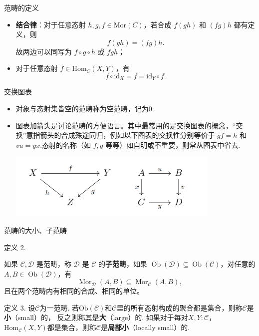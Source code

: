 \documentclass{beamer}
\newcommand\cat{\mathcal{C}}
\newcommand\obj[1]{\mathrm{Ob}(#1)}
\newcommand\Homc[3]{\mathrm{Hom}_{#1}(#2, #3)}
\begin{document}
	\begin{frame}{范畴的定义}
				\begin{itemize}[<+->]
				\item \textbf{结合律}：对于任意态射 $h, g, f \in \mathrm{Mor}(C)$，若合成 $f(gh)$ 和 $(fg)h$ 都有定义，则
				\[
				f(gh) = (fg)h.
				\]
				故两边可以同写为 $f \circ g \circ h$ 或 $fgh$；
				\item 对于任意态射 $f \in \mathrm{Hom}_C(X, Y)$，有
				\[
				f \circ \mathrm{id}_X = f = \mathrm{id}_Y \circ f.
				\]
			\end{itemize}
	\end{frame}
	
	
	\begin{frame}{交换图表}
		\begin{itemize}[<+->]
			\item 对象与态射集皆空的范畴称为空范畴，记为$0$.
			\item 图表加箭头是讨论范畴的方便语言。其中最常用的是交换图表的概念，“交换”意指箭头的合成殊途同归，例如以下图表的交换性分别等价于 $gf = h$ 和 $vu = yx$.态射的名称（如 $f, g$ 等等）如自明或不重要，则常从图表中省去.
			 \begin{center}
				\includegraphics[width=0.8\textwidth]{pic/figure1.png} 
			\end{center}
		\end{itemize}
		
	\end{frame}
	\begin{frame}{范畴的大小、子范畴}
		\begin{exampleblock}{定义 2.}
			
			如果 $\mathcal{C}, \mathcal{D}$ 是范畴，称 $\mathcal{D}$ 是 $\mathcal{C}$ 的\textbf{子范畴}，如果 $\operatorname{Ob}(\mathcal{D}) \subseteq \operatorname{Ob}(\mathcal{C})$，对任意的 $A, B \in \operatorname{Ob}(\mathcal{D})$，有
			\[
			\operatorname{Mor}_{\mathcal{D}}(A, B) \subseteq \operatorname{Mor}_{\mathcal{C}}(A, B),
			\]
			且在两个范畴内有相同的合成、相同的单位。
		\end{exampleblock}	
		\begin{exampleblock}{定义 3.}
			设$\cat$为一范畴. 若$\obj{\cat}$和$\cat$里的所有态射构成的聚合都是集合，则称$\cat$是\textbf{小}（small）的，
			反之则称其是\textbf{大}（large）的. 如果对于每对$X, Y : \cat$，
			$\Homc{\cat}{X}{Y}$都是集合，则称$\cat$是\textbf{局部小}（locally small）的.
	\end{exampleblock}
			
		
	\end{frame}
	
\end{document}
